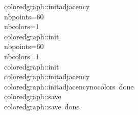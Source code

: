 \begin{tabbing}
coloredgraph::initadjacency\\[0pt]
nbpoints=60\\[0pt]
nbcolors=1\\[0pt]
coloredgraph::init\\[0pt]
nbpoints=60\\[0pt]
nbcolors=1\\[0pt]
coloredgraph::init\\[0pt]
coloredgraph::initadjacency\\[0pt]
coloredgraph::initadjacencynocolors\ done\\[0pt]
coloredgraph::save\\[0pt]
coloredgraph::save\ done\\[0pt]
\end{tabbing}
